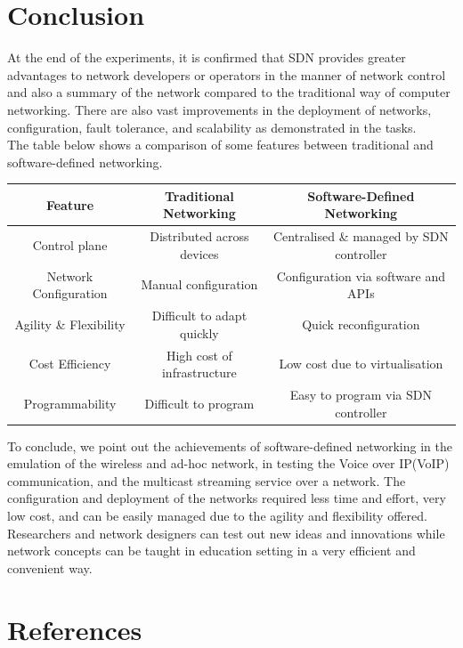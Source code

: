 \documentclass{article}
\begin{document}
\section{Conclusion}
At the end of the experiments, it is confirmed that SDN provides greater advantages to network developers or operators in the manner of network control and also a summary of the network compared to the traditional way of computer networking. There are also vast improvements in the deployment of networks, configuration, fault tolerance, and scalability as demonstrated in the tasks. \\ The table below shows a comparison of some features between traditional and software-defined networking.
	\begin{table}[h]
		\small
		\centering
		\begin{tabular}{|c|c|c|}
			\hline
			Feature & Traditional Networking & Software-Defined Networking \\
			\hline
			Control plane & Distributed across devices & Centralised \& managed by SDN controller \\
			Network Configuration & Manual configuration & Configuration via software and APIs \\
			Agility \& Flexibility & Difficult to adapt quickly & Quick reconfiguration \\
			Cost Efficiency & High cost of infrastructure & Low cost due to virtualisation \\
			Programmability & Difficult to program & Easy to program via SDN controller \\
			\hline
		\end{tabular}
	\end{table}
\par To conclude, we point out the achievements of software-defined networking in the emulation of the wireless and ad-hoc network, in testing the Voice over IP(VoIP) communication, and the multicast streaming service over a network. The configuration and deployment of the networks required less time and effort, very low cost, and can be easily managed due to the agility and flexibility offered. Researchers and network designers can test out new ideas and innovations while network concepts can be taught in education setting in a very efficient and convenient way.

\newpage
\section{References}


\end{document}
